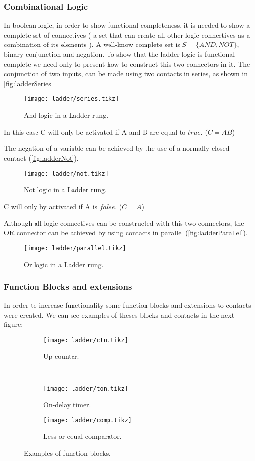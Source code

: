\subsubsection{Combinational Logic}
In boolean logic, in order to show functional completeness, it is needed to show a
complete set of connectives ( a set that can create all other logic connectives
as a combination of its elements ). A well-know complete set is $S=\{AND,NOT\}$,
binary conjunction and negation.
To show that the ladder logic is functional complete we need only to present how
to construct this two connectors in it.
The conjunction of two inputs, can be made using two contacts in series, as
shown in \autoref{fig:ladderSeries}
\begin{figure}[H]
  \centering \texttt{[image: ladder/series.tikz]}
  \caption{And logic in a Ladder rung.}
  \label{fig:ladderSeries}
\end{figure}
In this case C will only be activated if A and B are equal to $true$. ($C=AB$)

The negation of a variable can be achieved by the use of a normally closed
contact (\autoref{fig:ladderNot}).
\begin{figure}[H]
  \centering \texttt{[image: ladder/not.tikz]}
  \caption{Not logic in a Ladder rung.}
  \label{fig:ladderNot}
\end{figure}
C will only by activated if A is $false$. ($C=\overline{A}$)

Although all logic connectives can be constructed with this two connectors, the
OR connector can be achieved by using contacts in parallel (\autoref{fig:ladderParallel}).
\begin{figure}[H]
  \centering \texttt{[image: ladder/parallel.tikz]}
  \caption{Or logic in a Ladder rung.}
  \label{fig:ladderParallel}
\end{figure}



\subsubsection{Function Blocks and extensions}
In order to increase functionality some function blocks and 
extensions to contacts were created. We can see examples of theses blocks and
contacts in the next figure:

\begin{figure}[H]
   \centering
\begin{subfigure}[t]{0.45\textwidth}
  \centering \texttt{[image: ladder/ctu.tikz]}
  \caption{Up counter.}
  \label{fig:ctu}
\end{subfigure}
~
\begin{subfigure}[t]{0.45\textwidth}
  \centering \texttt{[image: ladder/ton.tikz]}
  \caption{On-delay timer.}
  \label{fig:ton}
\end{subfigure}

\begin{subfigure}[t]{0.45\textwidth}
  \centering \texttt{[image: ladder/comp.tikz]}
  \caption{Less or equal comparator.}
  \label{fig:comp}
\end{subfigure}
  \caption{Examples of function blocks.}
  \label{fig:functionBlocks}
\end{figure}

